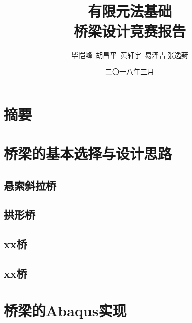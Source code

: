 \documentclass[forprint]{WHUBachelor}
\begin{document}



\title{\\有限元法基础\\桥梁设计竞赛报告}


\author{毕恺峰$\,$ 胡昌平$\,$ 黄轩宇 $\,$易泽吉$\,$张逸葑}                            %



\date{二〇一八年三月}                    %


\maketitle
\frontmatter
{}              %


\mainmatter %
\tableofcontents
\chapter{摘要}
\chapter{桥梁的基本选择与设计思路}
\section{悬索斜拉桥}
\section{拱形桥}
\section{xx桥}
\section{xx桥}
\chapter{桥梁的Abaqus实现}
\end{document}
